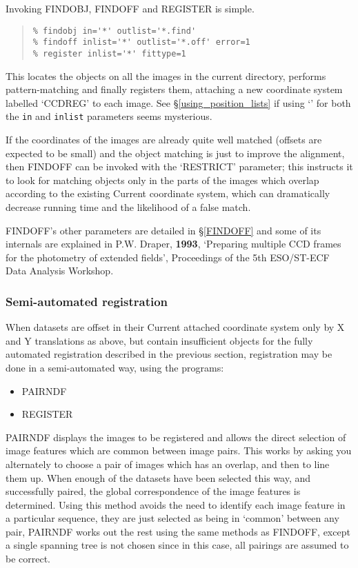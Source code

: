 \documentclass[twoside,11pt]{article}
\newcommand{\hyperref}[4]{#2\ref{#4}#3}
\newcommand{\htmlref}[2]{#1}
\newcommand{\xlabel}[1]{}
\renewcommand{\_}{\texttt{\symbol{95}}}
\newenvironment{myquote}{\begin{quote}\begin{small}}{\end{small}\end{quote}}
\newcommand{\text}[1]{{\small \tt #1}}
\newcommand{\routine}[1]{{\sc #1}}
\newcommand{\xroutine}[1]{\htmlref{{\sc #1}}{#1}}
\begin{document}
Invoking \xroutine{FINDOBJ}, \xroutine{FINDOFF} and
\xroutine{REGISTER} is simple.
\begin{myquote}
\begin{verbatim}
% findobj in='*' outlist='*.find'
% findoff inlist='*' outlist='*.off' error=1
% register inlist='*' fittype=1
\end{verbatim}
\end{myquote}
This locates the objects on all the images in the current directory,
performs pattern-matching and finally registers them, attaching
a new coordinate system labelled `CCD\_REG' to each image.
See \hyperref{``Using position lists''}{\S}{}{using_position_lists}
if using `\text{*}' for both the \text{in} and \text{inlist}
parameters seems mysterious.

If the coordinates of the images are already quite well matched
(offsets are expected to be small) 
and the object matching is just to improve the alignment,
then \routine{FINDOFF} can be invoked with the `RESTRICT' parameter;
this instructs it to look for matching objects only in the
parts of the images which overlap according to the existing
Current coordinate system, which can dramatically decrease running time 
and the likelihood of a false match.

\routine{FINDOFF}'s other parameters are detailed in
\hyperref{a later section}{\S}{}{FINDOFF} and some of its internals are
explained in P.W. Draper, {\bf 1993}, `Preparing multiple CCD frames for the
photometry of extended fields', Proceedings of the 5th ESO/ST-ECF Data
Analysis Workshop.



\subsubsection{\xlabel{semiautomated}Semi-automated registration}

When datasets are offset in their Current attached coordinate system
only by X and Y translations as above,
but contain insufficient objects for the fully automated registration
described in the previous section, 
registration may be done in a semi-automated way,
using the programs:
\begin{itemize}
\item \xroutine{PAIRNDF}
\item \xroutine{REGISTER}
\end{itemize}

\routine{PAIRNDF} displays the images to be registered and allows the direct
selection of image features which are common between image pairs.
This works by asking you alternately to choose a pair of images
which has an overlap, and then to line them up.
When enough of the datasets have been selected this way, and
successfully paired, the global correspondence of the image features
is determined. Using this method avoids the need to identify each
image feature in a particular sequence, they are just selected as
being in `common' between any pair, \routine{PAIRNDF} works out the rest using
the same methods as \xroutine{FINDOFF}, except a single spanning tree is not
chosen since in this case, all pairings are assumed to be correct.
\end{document}
